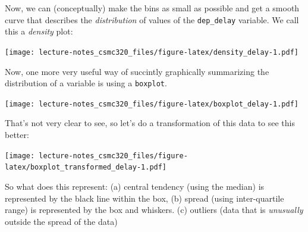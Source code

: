 \documentclass[12pt,]{book}
\newenvironment{Shaded}{\begin{snugshade}}{\end{snugshade}}
\newcommand{\KeywordTok}[1]{\textcolor[rgb]{0.13,0.29,0.53}{\textbf{#1}}}
\newcommand{\DataTypeTok}[1]{\textcolor[rgb]{0.13,0.29,0.53}{#1}}
\newcommand{\DecValTok}[1]{\textcolor[rgb]{0.00,0.00,0.81}{#1}}
\newcommand{\StringTok}[1]{\textcolor[rgb]{0.31,0.60,0.02}{#1}}
\newcommand{\OtherTok}[1]{\textcolor[rgb]{0.56,0.35,0.01}{#1}}
\newcommand{\OperatorTok}[1]{\textcolor[rgb]{0.81,0.36,0.00}{\textbf{#1}}}
\newcommand{\NormalTok}[1]{#1}
\theoremstyle{definition}
\theoremstyle{definition}
\theoremstyle{definition}
\theoremstyle{remark}
\begin{document}
Now, we can (conceptually) make the bins as small as possible and get a
smooth curve that describes the \emph{distribution} of values of the
\texttt{dep\_delay} variable. We call this a \emph{density} plot:

\begin{Shaded}
\end{Shaded}

\texttt{[image: lecture-notes\_csmc320\_files/figure-latex/density\_delay-1.pdf]}

Now, one more very useful way of succintly graphically summarizing the
distribution of a variable is using a \texttt{boxplot}.

\begin{Shaded}
\end{Shaded}

\texttt{[image: lecture-notes\_csmc320\_files/figure-latex/boxplot\_delay-1.pdf]}

That's not very clear to see, so let's do a transformation of this data
to see this better:

\begin{Shaded}
\end{Shaded}

\texttt{[image: lecture-notes\_csmc320\_files/figure-latex/boxplot\_transformed\_delay-1.pdf]}

So what does this represent: (a) central tendency (using the median) is
represented by the black line within the box, (b) spread (using
inter-quartile range) is represented by the box and whiskers. (c)
outliers (data that is \emph{unusually} outside the spread of the data)
\end{document}
